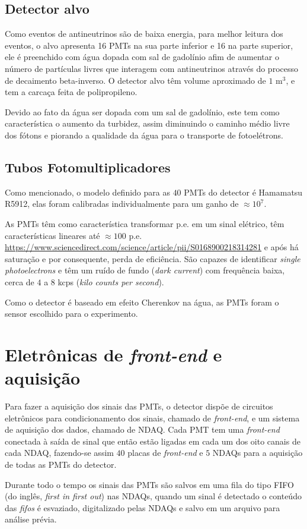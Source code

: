 \subsection{Detector alvo}

Como eventos de antineutrinos são de baixa energia, para melhor leitura dos eventos, o alvo apresenta 16 PMTs na sua parte inferior e 16 na parte superior, ele é preenchido com água dopada com sal de gadolínio afim de aumentar o número de partículas livres que interagem com antineutrinos através do processo de decaimento beta-inverso. O detector alvo têm volume aproximado de $1$ m$^3$, e tem a carcaça feita de polipropileno.


Devido ao fato da água ser dopada com um sal de gadolínio, este tem como característica o aumento da turbidez, assim diminuindo o caminho médio livre dos fótons e piorando a qualidade da água para o transporte de fotoelétrons.

\subsection{Tubos Fotomultiplicadores} \label{subsec:pmt}

Como mencionado, o modelo definido para as $40$ PMTs do detector é Hamamatsu R5912, elas foram calibradas individualmente para um ganho de $\approx10^7$.

As PMTs têm como característica transformar  \ac{p.e.} em um sinal elétrico, têm características lineares até $\approx 100$ p.e. \url{https://www.sciencedirect.com/science/article/pii/S0168900218314281} e após há saturação e por consequente, perda de eficiência. São capazes de identificar \emph{single photoelectrons} e têm um ruído de fundo (\emph{dark current}) com frequência baixa, cerca de $4$ a $8$ kcps (\emph{kilo counts per second}). 

Como o detector é baseado em efeito Cherenkov na água, as PMTs foram o sensor escolhido para o experimento.


\section{Eletrônicas de \emph{front-end} e aquisição}

Para fazer a aquisição dos sinais das PMTs, o detector dispõe de circuitos eletrônicos para condicionamento dos sinais, chamado de \emph{front-end}, e um sistema de aquisição dos dados, chamado de \ac{NDAQ}. Cada PMT tem uma \emph{front-end} conectada à saída de sinal que então estão ligadas em cada um dos oito canais de cada NDAQ, fazendo-se assim $40$ placas de \emph{front-end} e $5$ NDAQs para a aquisição de todas as PMTs do detector.

Durante todo o tempo os sinais das PMTs são salvos em uma fila do tipo FIFO (do inglês, \emph{first in first out}) nas NDAQs, quando um sinal é detectado o conteúdo das \emph{fifos} é esvaziado, digitalizado pelas NDAQs e salvo em um arquivo para análise prévia.

